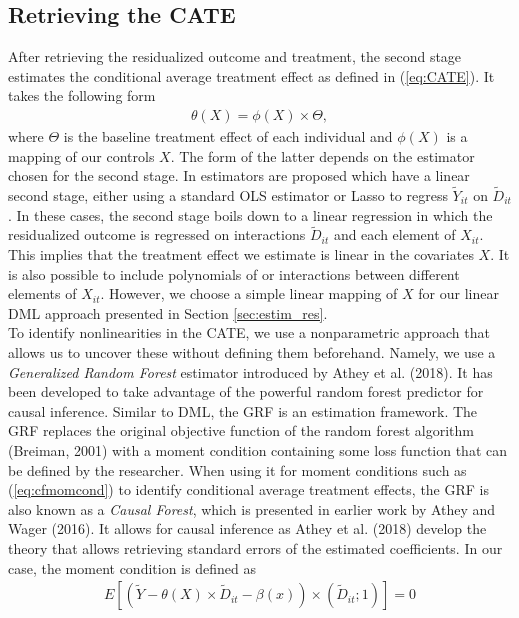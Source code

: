 \subsection{Retrieving the CATE}
After retrieving the residualized outcome and treatment, the second stage estimates the conditional average treatment effect as defined in (\ref{eq:CATE}). It takes the following form
\begin{align} 
    \theta(X)=\phi(X) \times \Theta, \label{eq:CATE}
\end{align} 
where $\Theta$ is the baseline treatment effect of each individual and $\phi(X)$ is a mapping of our controls $X$. The form of the latter depends on the estimator chosen for the second stage. In \cite{DML2017} estimators are proposed which have a linear second stage, either using a standard OLS estimator or Lasso to regress $\tilde{Y}_{it}$ on $\tilde{D}_{it}$. In these cases, the second stage boils down to a linear regression in which the residualized outcome is regressed on interactions $\tilde{D}_{it}$ and each element of $X_{it}$. This implies that the treatment effect we estimate is linear in the covariates $X$. It is also possible to include polynomials of or interactions between different elements of $X_{it}$. However, we choose a simple linear mapping of $X$ for our linear DML approach presented in Section \ref{sec:estim_res}. \\
To identify nonlinearities in the CATE, we use a nonparametric approach that allows us to uncover these without defining them beforehand. Namely, we use a \textit{Generalized Random Forest} estimator introduced by Athey et al. (2018). It has been developed to take advantage of the powerful random forest predictor for causal inference. Similar to DML, the GRF is an estimation framework. The GRF replaces the original objective function of the random forest algorithm (Breiman, 2001) with a moment condition containing some loss function that can be defined by the researcher. When using it for moment conditions such as (\ref{eq:cfmomcond}) to identify conditional average treatment effects, the GRF is also known as a \textit{Causal Forest}, which is presented in earlier work by Athey and Wager (2016). It allows for causal inference as Athey et al. (2018) develop the theory that allows retrieving standard errors of the estimated coefficients. In our case, the moment condition is defined as 
\begin{align}
    E \left[\left(\tilde{Y}- \theta(X) \times \tilde{D}_{it} - \beta(x)\right) \times (\tilde{D}_{it}; 1) \right] = 0 \label{eq:cfmomcond}
\end{align}
